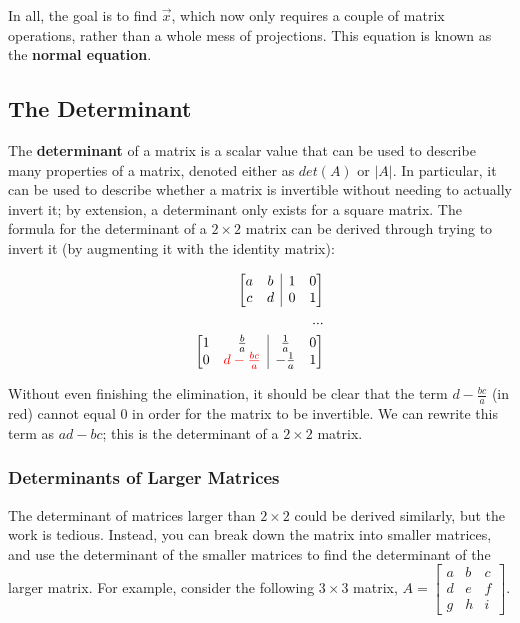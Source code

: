 \documentclass[12pt]{article}
\begin{document}
{In all, the goal is to find $\vec{x}$, which now only requires a couple of matrix operations, rather than a whole mess of projections. This equation is known as the \textbf{normal equation}.

\subsection{The Determinant}

The \textbf{determinant} of a matrix is a scalar value that can be used to describe many properties of a matrix, denoted either as $det(A)$ or $|A|$. In particular, it can be used to describe whether a matrix is invertible without needing to actually invert it; by extension, a determinant only exists for a square matrix. The formula for the determinant of a $2 \times 2$ matrix can be derived through trying to invert it (by augmenting it with the identity matrix):

\begin{equation}
    \begin{split}
        \begin{array}[t][{@{}cc|cc@{}}]
            a & b & 1 & 0 \\
            c & d & 0 & 1 \\
        \end{array}\\
        ...\\
        \begin{array}[t][{@{}cc|cc@{}}]
            1 & \frac{b}{a} & \frac{1}{a} & 0 \\
            0 & \red{d-\frac{bc}{a}} & -\frac{1}{a} & 1 \\
        \end{array}\\
    \end{split}
\end{equation}

Without even finishing the elimination, it should be clear that the term $d-\frac{bc}{a}$ (in red) cannot equal 0 in order for the matrix to be invertible. We can rewrite this term as $ad-bc$; this is the determinant of a $2 \times 2$ matrix. 

\subsubsection{Determinants of Larger Matrices}

The determinant of matrices larger than $2 \times 2$ could be derived similarly, but the work is tedious. Instead, you can break down the matrix into smaller matrices, and use the determinant of the smaller matrices to find the determinant of the larger matrix. For example, consider the following $3 \times 3$ matrix, $A = \begin{bmatrix}
    a & b & c\\
    d & e & f\\
    g & h & i
\end{bmatrix}$. 

}
\end{document}
